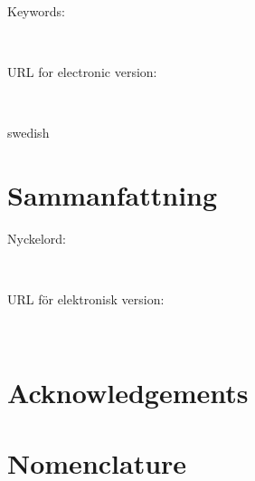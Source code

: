 \documentclass{book}
\makeatletter
\newcommand{\svkeywordslabel}{Nyckelord}
\newcommand{\enkeywordslabel}{Keywords}
\newcommand{\svurllabel}{URL för elektronisk version}
\newcommand{\enurllabel}{URL for electronic version}
\def\cleardoublepage{%
	\clearpage
	\if@twoside
		\ifodd\c@page
		\else
			\hbox{}%
			\thispagestyle{empty}%
			\newpage
			\if@twocolumn
				\hbox{}%
				\newpage
			\fi
		\fi
	\fi}
\newcommand{\svkeywords}{} %
\newcommand{\enkeywords}{} %
\newcommand{\publishurl}{} %
\makeatother
\begin{document}
\begin{description}
	\item[\enkeywordslabel:]\leavevmode\\
	\enkeywords
\end{description}
\begin{description}
	\item[\enurllabel:]\leavevmode\\
	\url{\publishurl}
\end{description}

\cleardoublepage

\begin{otherlanguage*}{swedish}
\chapter*{Sammanfattning}


\begin{description}
	\item[\svkeywordslabel:]\leavevmode\\
	\svkeywords
\end{description}
\begin{description}
	\item[\svurllabel:]\leavevmode\\
	\url{\publishurl}
\end{description}
\end{otherlanguage*}

\chapter*{Acknowledgements}


\chapter*{Nomenclature}

\end{document}
